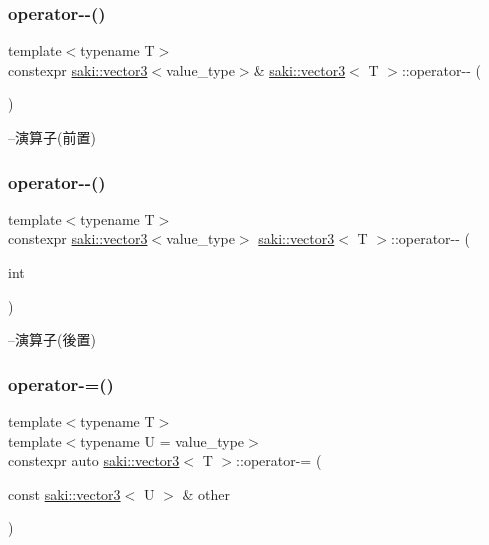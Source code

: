 \subsubsection{\texorpdfstring{operator-\/-\/()}{operator--()}\hspace{0.1cm}{\footnotesize\ttfamily [1/2]}}
{\footnotesize\ttfamily template$<$typename T$>$ \\
constexpr \mbox{\hyperlink{classsaki_1_1vector3}{saki\+::vector3}}$<$value\+\_\+type$>$\& \mbox{\hyperlink{classsaki_1_1vector3}{saki\+::vector3}}$<$ T $>$\+::operator-\/-\/ (\begin{DoxyParamCaption}{ }\end{DoxyParamCaption})\hspace{0.3cm}{\ttfamily [inline]}}



--演算子(前置) 

\mbox{\label{classsaki_1_1vector3_a9b3a81278ca27fc7fc43417c47cb80a4}} 
\subsubsection{\texorpdfstring{operator-\/-\/()}{operator--()}\hspace{0.1cm}{\footnotesize\ttfamily [2/2]}}
{\footnotesize\ttfamily template$<$typename T$>$ \\
constexpr \mbox{\hyperlink{classsaki_1_1vector3}{saki\+::vector3}}$<$value\+\_\+type$>$ \mbox{\hyperlink{classsaki_1_1vector3}{saki\+::vector3}}$<$ T $>$\+::operator-\/-\/ (\begin{DoxyParamCaption}\item[{int}]{ }\end{DoxyParamCaption})\hspace{0.3cm}{\ttfamily [inline]}}



--演算子(後置) 

\mbox{\label{classsaki_1_1vector3_ad52d6e5aff4f4c1575f9f4ee07730eff}} 
\subsubsection{\texorpdfstring{operator-\/=()}{operator-=()}}
{\footnotesize\ttfamily template$<$typename T$>$ \\
template$<$typename U  = value\+\_\+type$>$ \\
constexpr auto \mbox{\hyperlink{classsaki_1_1vector3}{saki\+::vector3}}$<$ T $>$\+::operator-\/= (\begin{DoxyParamCaption}\item[{const \mbox{\hyperlink{classsaki_1_1vector3}{saki\+::vector3}}$<$ U $>$ \&}]{other }\end{DoxyParamCaption})\hspace{0.3cm}{\ttfamily [inline]}}



